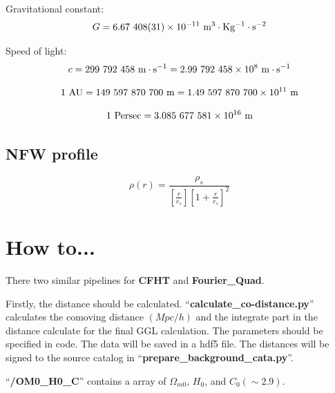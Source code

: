 \documentclass[12pt, a4paper]{article}
\begin{document}
Gravitational constant:
\begin{equation}
G = 6.67\  408(31) \times 10^{-11} \ \rm{m^3 \cdot Kg^{-1}\cdot s^{-2}}
\end{equation}

Speed of light:
\begin{equation}
c = 299\  792\  458 \ \rm{m\cdot s^{-1}} = 2.99\  792\  458 \times 10^8 \ \rm{m\cdot s^{-1}}
\end{equation} 

\begin{equation}
1\  \rm{AU} = 149\  597\  870\  700 \ \rm{m} = 1.49\   597\   870\   700 \times 10^{11} \ \rm{m}
\end{equation}

\begin{equation}
1 \ \rm{Persec} =  3.085\  677\  581 \times 10^{16} \ \rm{m}
\end{equation}



\subsection{NFW profile}
\begin{equation}
\rho(r)= \frac{\rho_s}{[\frac{r}{r_s}][1+\frac{r}{r_s}]^2}
\end{equation}
\section{How to...}
There two similar pipelines for \textbf{CFHT} and \textbf{Fourier\_Quad}.

Firstly, the distance should be calculated. ``\textbf{calculate\_co-distance.py}'' calculates the comoving distance $(Mpc/h)$ and the integrate part in the distance calculate for the final GGL calculation. 
The parameters should be specified in code. The data will be saved in a hdf5 file. The distances will be signed to the source catalog in ``\textbf{prepare\_background\_cata.py}''.

\noindent``\textbf{/OM0\_H0\_C}'' contains a array of $\Omega_{m0}$, $H_0$, and $C_0(\sim 2.9)$.
\end{document}
